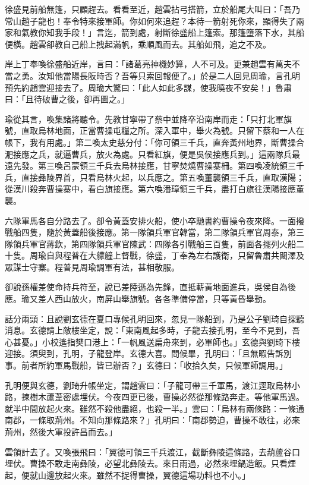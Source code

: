 徐盛見前船無篷，只顧趕去。看看至近，趙雲拈弓搭箭，立於船尾大叫曰：「吾乃常山趙子龍也！奉令特來接軍師。你如何來追趕？本待一箭射死你來，顯得失了兩家和氣教你知我手段！」言迄，箭到處，射斷徐盛船上篷索。那篷墮落下水，其船便橫。趙雲卻教自己船上拽起滿帆，乘順風而去。其船如飛，追之不及。

岸上丁奉喚徐盛船近岸，言曰：「諸葛亮神機妙算，人不可及。更兼趙雲有萬夫不當之勇。汝知他當陽長阪時否？吾等只索回報便了。」於是二人回見周瑜，言孔明預先約趙雲迎接去了。周瑜大驚曰：「此人如此多謀，使我曉夜不安矣！」魯肅曰：「且待破曹之後，卻再圖之。」

瑜從其言，喚集諸將聽令。先教甘寧帶了蔡中並降卒沿南岸而走：「只打北軍旗號，直取烏林地面，正當曹操屯糧之所。深入軍中，舉火為號。只留下蔡和一人在帳下，我有用處。」第二喚太史慈分付：「你可領三千兵，直奔黃州地界，斷曹操合淝接應之兵，就逼曹兵，放火為處。只看紅旗，便是吳侯接應兵到。」這兩隊兵最遠先發。第三喚呂蒙領三千兵去烏林接應，甘寧焚燒曹操寨柵。第四喚凌統領三千兵，直接彝陵界首，只看烏林火起，以兵應之。第五喚董襲領三千兵，直取漢陽；從漢川殺奔曹操寨中，看白旗接應。第六喚潘璋領三千兵，盡打白旗往漢陽接應董襲。

六隊軍馬各自分路去了。卻令黃蓋安排火船，使小卒馳書約曹操令夜來降。一面撥戰船四隻，隨於黃蓋船後接應。第一隊領兵軍官韓當，第二隊領兵軍官周泰，第三隊領兵軍官蔣欽，第四隊領兵軍官陳武：四隊各引戰船三百隻，前面各擺列火船二十隻。周瑜自與程普在大艨艟上督戰，徐盛，丁奉為左右護衛，只留魯肅共闞澤及眾謀士守寨。程普見周瑜調軍有法，甚相敬服。

卻說孫權差使命持兵符至，說已差陸遜為先鋒，直抵蔪黃地面進兵，吳侯自為後應。瑜又差人西山放火，南屏山舉旗號。各各準備停當，只等黃昏舉動。

話分兩頭：且說劉玄德在夏口專候孔明回來，忽見一隊船到，乃是公子劉琦自探聽消息。玄德請上敵樓坐定，說：「東南風起多時，子龍去接孔明，至今不見到，吾心甚憂。」小校遙指樊口港上：「一帆風送扁舟來到，必軍師也。」玄德與劉琦下樓迎接。須臾到，孔明，子龍登岸。玄德大喜。問候畢，孔明曰：「且無暇告訴別事。前者所約軍馬戰船，皆已辦否？」玄德曰：「收拾久矣，只候軍師調用。」

孔明便與玄德，劉琦升帳坐定，謂趙雲曰：「子龍可帶三千軍馬，渡江逕取烏林小路，揀樹木蘆葦密處埋伏。今夜四更已後，曹操必然從那條路奔走。等他軍馬過。就半中間放起火來。雖然不殺他盡絕，也殺一半。」雲曰：「烏林有兩條路：一條通南郡，一條取荊州。不知向那條路來？」孔明曰：「南郡勢迫，曹操不敢往，必來荊州，然後大軍投許昌而去。」

雲領計去了。又喚張飛曰：「翼德可領三千兵渡江，截斷彝陵這條路，去葫蘆谷口埋伏。曹操不敢走南彝陵，必望北彝陵去。來日雨過，必然來埋鍋造飯。只看煙起，便就山邊放起火來。雖然不捉得曹操，翼德這場功料也不小。」

